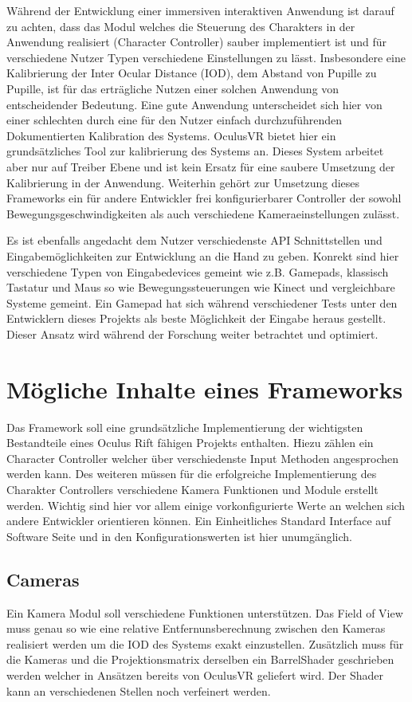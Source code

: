 \documentclass[pagesize, paper=a4, fontsize=12pt,titlepage=true, headings=small, headnosepline, abstractoff, liststotoc, nochapterprefix, plainheadsepline]{scrreprt}
\begin{document}
Während der Entwicklung einer immersiven interaktiven Anwendung ist darauf zu achten, dass das Modul welches die Steuerung des Charakters in der Anwendung realisiert (Character Controller) sauber implementiert ist und für verschiedene Nutzer Typen verschiedene Einstellungen zu lässt. Insbesondere eine Kalibrierung der Inter Ocular Distance (IOD), dem Abstand von Pupille zu Pupille, ist für das erträgliche Nutzen einer solchen Anwendung von entscheidender Bedeutung. Eine gute Anwendung unterscheidet sich hier von einer schlechten durch eine für den Nutzer einfach durchzuführenden Dokumentierten Kalibration des Systems. OculusVR bietet hier ein grundsätzliches Tool zur kalibrierung des Systems an. Dieses System arbeitet aber nur auf Treiber Ebene und ist kein Ersatz für eine saubere Umsetzung der Kalibrierung in der Anwendung.
Weiterhin gehört zur  Umsetzung dieses Frameworks ein für andere Entwickler frei konfigurierbarer Controller der sowohl Bewegungsgeschwindigkeiten als auch verschiedene Kameraeinstellungen zulässt.

Es ist ebenfalls angedacht dem Nutzer verschiedenste API Schnittstellen und Eingabemöglichkeiten zur Entwicklung an die Hand zu geben. Konrekt sind hier verschiedene Typen von Eingabedevices gemeint wie z.B. Gamepads, klassisch Tastatur und Maus so wie Bewegungssteuerungen wie Kinect und vergleichbare Systeme gemeint. Ein Gamepad hat sich während verschiedener Tests unter den Entwicklern dieses Projekts als beste Möglichkeit der Eingabe heraus gestellt. Dieser Ansatz wird während der Forschung weiter betrachtet und optimiert.


\section{Mögliche Inhalte eines Frameworks}
Das Framework soll eine grundsätzliche Implementierung der wichtigsten Bestandteile eines Oculus Rift fähigen Projekts enthalten. Hiezu zählen ein Character Controller welcher über verschiedenste Input Methoden angesprochen werden kann. Des weiteren müssen für die erfolgreiche Implementierung des Charakter Controllers verschiedene Kamera Funktionen und Module erstellt werden. Wichtig sind hier vor allem einige vorkonfigurierte Werte an welchen sich andere Entwickler orientieren können. Ein Einheitliches Standard Interface auf Software Seite und in den Konfigurationswerten ist hier unumgänglich.

\subsection{Cameras}
Ein Kamera Modul soll verschiedene Funktionen unterstützen. Das Field of View muss genau  so wie eine relative Entfernunsberechnung zwischen den Kameras realisiert werden um die IOD des Systems exakt einzustellen. Zusätzlich muss für die Kameras und die Projektionsmatrix derselben ein BarrelShader geschrieben werden welcher in Ansätzen bereits von OculusVR geliefert wird. Der Shader kann an verschiedenen Stellen noch verfeinert werden.
\end{document}
